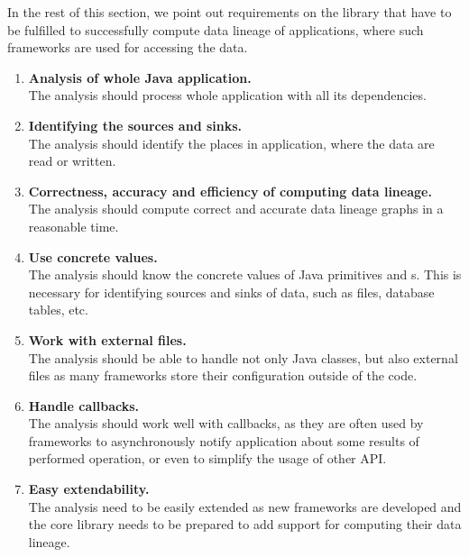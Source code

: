 In the rest of this section, we point out requirements on the library that
have to be fulfilled to successfully compute data lineage of applications,
where such frameworks are used for accessing the data.

\begin{enumerate}
  \item \textbf{Analysis of whole Java application.} \\
    The analysis should process whole application with all its dependencies.
  \item \textbf{Identifying the sources and sinks.} \\
    The analysis should identify the places in application, where the data
    are read or written.
  \item \textbf{Correctness, accuracy and efficiency of computing data lineage.} \\
    The analysis should compute correct and accurate data lineage graphs in a reasonable time.
  \item \textbf{Use concrete values.} \\
    The analysis should know the concrete values of Java primitives and s.
    This is necessary for identifying sources and sinks of data,
    such as files, database tables, etc.
  \item \textbf{Work with external files.} \\
    The analysis should be able to handle not only Java classes,
    but also external files as many frameworks store their configuration
    outside of the code.
  \item \textbf{Handle callbacks.} \\
    The analysis should work well with callbacks, as they are often
    used by frameworks to asynchronously notify application
    about some results of performed operation, or even
    to simplify the usage of other API.
  \item \textbf{Easy extendability.} \\
    The analysis need to be easily extended as new frameworks are developed
    and the core library needs to be prepared to add support for computing their data lineage.
\end{enumerate}



